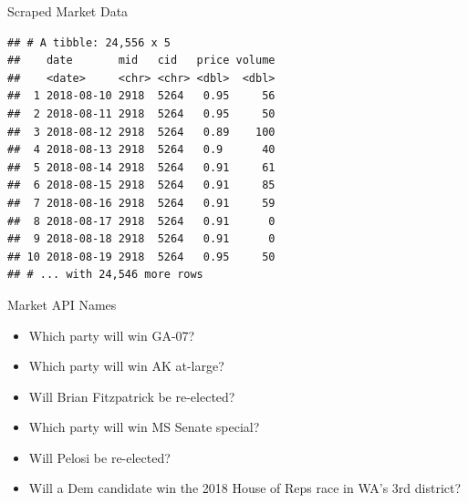 \documentclass[ignorenonframetext,]{beamer}
\providecommand{\tightlist}{%
  \setlength{\itemsep}{0pt}\setlength{\parskip}{0pt}}
\begin{document}
\begin{frame}[fragile]{Scraped Market Data}

\begin{verbatim}
## # A tibble: 24,556 x 5
##    date       mid   cid   price volume
##    <date>     <chr> <chr> <dbl>  <dbl>
##  1 2018-08-10 2918  5264   0.95     56
##  2 2018-08-11 2918  5264   0.95     50
##  3 2018-08-12 2918  5264   0.89    100
##  4 2018-08-13 2918  5264   0.9      40
##  5 2018-08-14 2918  5264   0.91     61
##  6 2018-08-15 2918  5264   0.91     85
##  7 2018-08-16 2918  5264   0.91     59
##  8 2018-08-17 2918  5264   0.91      0
##  9 2018-08-18 2918  5264   0.91      0
## 10 2018-08-19 2918  5264   0.95     50
## # ... with 24,546 more rows
\end{verbatim}

\end{frame}

\begin{frame}{Market API Names}

\begin{itemize}
\tightlist
\item
  Which party will win GA-07?
\item
  Which party will win AK at-large?
\item
  Will Brian Fitzpatrick be re-elected?
\item
  Which party will win MS Senate special?
\item
  Will Pelosi be re-elected?
\item
  Will a Dem candidate win the 2018 House of Reps race in WA's 3rd
  district?
\end{itemize}

\end{frame}
\end{document}
